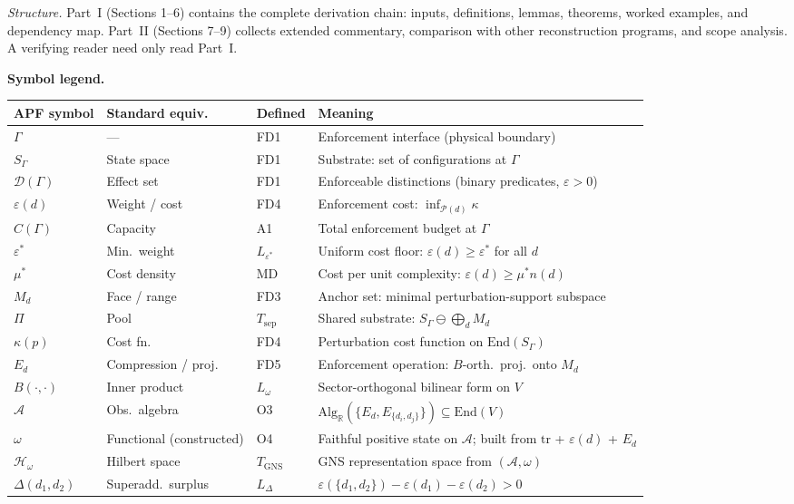 \documentclass[11pt,a4paper]{article}
\theoremstyle{definition}
\newcommand{\eps}{\varepsilon}
\newcommand{\End}{\mathrm{End}}
\newcommand{\tr}{\mathrm{tr}}
\begin{document}
\smallskip\noindent\textit{Structure.}  Part~I (Sections 1--6) contains the complete derivation chain: inputs, definitions, lemmas, theorems, worked examples, and dependency map.  Part~II (Sections 7--9) collects extended commentary, comparison with other reconstruction programs, and scope analysis.  A verifying reader need only read Part~I.

\medskip\noindent\textbf{Symbol legend.}

\smallskip
\begin{center}\small
\renewcommand{\arraystretch}{1.15}
\begin{tabular}{@{}lllp{4.5cm}@{}}
\toprule
\textbf{APF symbol} & \textbf{Standard equiv.} & \textbf{Defined} & \textbf{Meaning} \\
\midrule
$\Gamma$ & --- & FD1 & Enforcement interface (physical boundary) \\
$S_\Gamma$ & State space & FD1 & Substrate: set of configurations at $\Gamma$ \\
$\mathcal{D}(\Gamma)$ & Effect set & FD1 & Enforceable distinctions (binary predicates, $\eps > 0$) \\
$\eps(d)$ & Weight / cost & FD4 & Enforcement cost: $\inf_{\mathcal{P}(d)} \kappa$ \\
$C(\Gamma)$ & Capacity & A1 & Total enforcement budget at $\Gamma$ \\
$\eps^*$ & Min.\ weight & $L_{\eps^*}$ & Uniform cost floor: $\eps(d) \ge \eps^*$ for all $d$ \\
$\mu^*$ & Cost density & MD & Cost per unit complexity: $\eps(d) \ge \mu^* n(d)$ \\
$M_d$ & Face / range & FD3 & Anchor set: minimal perturbation-support subspace \\
$\Pi$ & Pool & $T_{\mathrm{sep}}$ & Shared substrate: $S_\Gamma \ominus \bigoplus_d M_d$ \\
$\kappa(p)$ & Cost fn.\ & FD4 & Perturbation cost function on $\End(S_\Gamma)$ \\
$E_d$ & Compression / proj. & FD5 & Enforcement operation: $B$-orth.\ proj.\ onto $M_d$ \\
$B(\cdot,\cdot)$ & Inner product & $L_\omega$ & Sector-orthogonal bilinear form on $V$ \\
$\mathcal{A}$ & Obs.\ algebra & O3 & $\mathrm{Alg}_\mathbb{R}(\{E_d, E_{\{d_i,d_j\}}\}) \subseteq \End(V)$ \\
$\omega$ & Functional (constructed) & O4 & Faithful positive state on $\mathcal{A}$; built from $\tr$ + $\eps(d)$ + $E_d$ \\
$\mathcal{H}_\omega$ & Hilbert space & $T_{\mathrm{GNS}}$ & GNS representation space from $(\mathcal{A}, \omega)$ \\
$\Delta(d_1,d_2)$ & Superadd.\ surplus & $L_\Delta$ & $\eps(\{d_1,d_2\}) - \eps(d_1) - \eps(d_2) > 0$ \\
\bottomrule
\end{tabular}
\end{center}
\end{document}
